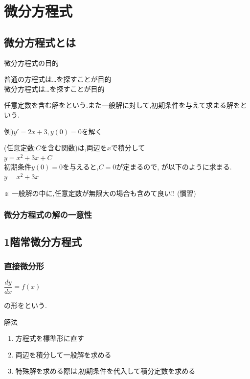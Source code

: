 \documentclass[a4paper]{jsarticle}
\begin{document}
\section{微分方程式}
\subsection{微分方程式とは}
\begin{itembox}[l]{微分方程式の目的}
    \begin{center}
        普通の方程式は\dots\qquad{}を探すことが目的\\
        微分方程式は\dots\qquad{}を探すことが目的
    \end{center}
\end{itembox}
任意定数を含む解をという.また一般解に対して,初期条件を与えて求まる解をという.
\begin{itembox}[l]{例)\quad$y'=2x+3,y\left(0\right)=0$を解く}
    \begin{center}
        (任意定数:$C$を含む関数)は,両辺を$x$で積分して\\
        $y=x^2+3x+C$\\
        初期条件$y\left(0\right)=0$を与えると,$C=0$が定まるので,
        が以下のように求まる.\\
        $y=x^2+3x$
    \end{center}
\end{itembox}
※ 一般解の中に,任意定数が無限大の場合も含めて良い!! (慣習)
\subsubsection{微分方程式の解の一意性}
\subsection{1階常微分方程式}
\subsubsection{直接微分形}
\begin{center}
    $\dfrac{dy}{dx}=f\left(x\right)$
\end{center}
の形をという.
\begin{itembox}[l]{解法}
    \begin{enumerate}[(1)]
        \item 方程式を標準形に直す
        \item 両辺を積分して一般解を求める
        \item 特殊解を求める際は,初期条件を代入して積分定数を求める
    \end{enumerate}
\end{itembox}
\end{document}
